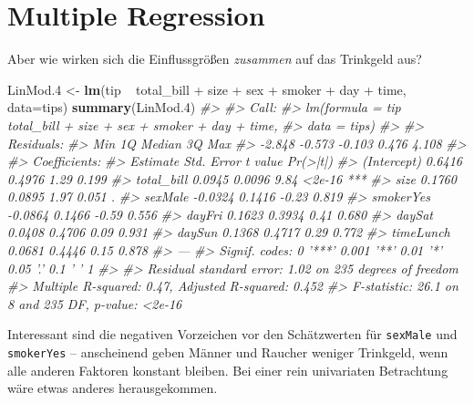 \documentclass[12pt,]{book}
\makeatletter
\newenvironment{Shaded}{\begin{snugshade}}{\end{snugshade}}
\newcommand{\KeywordTok}[1]{\textcolor[rgb]{0.13,0.29,0.53}{\textbf{{#1}}}}
\newcommand{\DataTypeTok}[1]{\textcolor[rgb]{0.13,0.29,0.53}{{#1}}}
\newcommand{\FloatTok}[1]{\textcolor[rgb]{0.00,0.00,0.81}{{#1}}}
\newcommand{\StringTok}[1]{\textcolor[rgb]{0.31,0.60,0.02}{{#1}}}
\newcommand{\CommentTok}[1]{\textcolor[rgb]{0.56,0.35,0.01}{\textit{{#1}}}}
\newcommand{\NormalTok}[1]{{#1}}
\newenvironment{kframe}{%
\medskip{}
\setlength{\fboxsep}{.8em}
 \def\at@end@of@kframe{}%
 \ifinner\ifhmode%
  \def\at@end@of@kframe{\end{minipage}}%
  \begin{minipage}{\columnwidth}%
 \fi\fi%
 \def\FrameCommand##1{\hskip\@totalleftmargin \hskip-\fboxsep
 \colorbox{shadecolor}{##1}\hskip-\fboxsep
     \hskip-\linewidth \hskip-\@totalleftmargin \hskip\columnwidth}%
 \MakeFramed {\advance\hsize-\width
   \@totalleftmargin\z@ \linewidth\hsize
   \@setminipage}}%
 {\par\unskip\endMakeFramed%
 \at@end@of@kframe}
\renewenvironment{Shaded}{\begin{kframe}}{\end{kframe}}
\makeatother
\begin{document}
\section{Multiple Regression}\label{multiple-regression}

Aber wie wirken sich die Einflussgrößen \emph{zusammen} auf das
Trinkgeld aus?

\begin{Shaded}
\begin{Highlighting}[]
\NormalTok{LinMod}\FloatTok{.4} \NormalTok{<-}\StringTok{ }\KeywordTok{lm}\NormalTok{(tip ~}\StringTok{ }\NormalTok{total_bill +}\StringTok{ }\NormalTok{size +}\StringTok{ }\NormalTok{sex  +}\StringTok{ }\NormalTok{smoker +}\StringTok{ }\NormalTok{day +}\StringTok{ }\NormalTok{time, }\DataTypeTok{data=}\NormalTok{tips)}
\KeywordTok{summary}\NormalTok{(LinMod}\FloatTok{.4}\NormalTok{)}
\CommentTok{#> }
\CommentTok{#> Call:}
\CommentTok{#> lm(formula = tip ~ total_bill + size + sex + smoker + day + time, }
\CommentTok{#>     data = tips)}
\CommentTok{#> }
\CommentTok{#> Residuals:}
\CommentTok{#>    Min     1Q Median     3Q    Max }
\CommentTok{#> -2.848 -0.573 -0.103  0.476  4.108 }
\CommentTok{#> }
\CommentTok{#> Coefficients:}
\CommentTok{#>             Estimate Std. Error t value Pr(>|t|)    }
\CommentTok{#> (Intercept)   0.6416     0.4976    1.29    0.199    }
\CommentTok{#> total_bill    0.0945     0.0096    9.84   <2e-16 ***}
\CommentTok{#> size          0.1760     0.0895    1.97    0.051 .  }
\CommentTok{#> sexMale      -0.0324     0.1416   -0.23    0.819    }
\CommentTok{#> smokerYes    -0.0864     0.1466   -0.59    0.556    }
\CommentTok{#> dayFri        0.1623     0.3934    0.41    0.680    }
\CommentTok{#> daySat        0.0408     0.4706    0.09    0.931    }
\CommentTok{#> daySun        0.1368     0.4717    0.29    0.772    }
\CommentTok{#> timeLunch     0.0681     0.4446    0.15    0.878    }
\CommentTok{#> ---}
\CommentTok{#> Signif. codes:  0 '***' 0.001 '**' 0.01 '*' 0.05 '.' 0.1 ' ' 1}
\CommentTok{#> }
\CommentTok{#> Residual standard error: 1.02 on 235 degrees of freedom}
\CommentTok{#> Multiple R-squared:  0.47,   Adjusted R-squared:  0.452 }
\CommentTok{#> F-statistic: 26.1 on 8 and 235 DF,  p-value: <2e-16}
\end{Highlighting}
\end{Shaded}

Interessant sind die negativen Vorzeichen vor den Schätzwerten für
\texttt{sexMale} und \texttt{smokerYes} -- anscheinend geben Männer und
Raucher weniger Trinkgeld, wenn alle anderen Faktoren konstant bleiben.
Bei einer rein univariaten Betrachtung wäre etwas anderes
herausgekommen.
\end{document}
